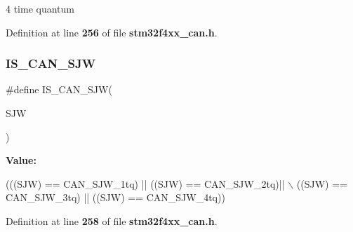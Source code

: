 4 time quantum 

Definition at line \textbf{ 256} of file \textbf{ stm32f4xx\+\_\+can.\+h}.

\mbox{\label{group__CAN__synchronisation__jump__width_ga4e4f344712d3bcac1975318d4ab9a383}} 
\subsubsection{I\+S\+\_\+\+C\+A\+N\+\_\+\+S\+JW}
{\footnotesize\ttfamily \#define I\+S\+\_\+\+C\+A\+N\+\_\+\+S\+JW(\begin{DoxyParamCaption}\item[{}]{S\+JW }\end{DoxyParamCaption})}

{\bfseries Value\+:}
\begin{DoxyCode}
(((SJW) == CAN_SJW_1tq) || ((SJW) == CAN_SJW_2tq)|| \(\backslash\)
                         ((SJW) == CAN_SJW_3tq) || ((SJW) == CAN_SJW_4tq))
\end{DoxyCode}


Definition at line \textbf{ 258} of file \textbf{ stm32f4xx\+\_\+can.\+h}.

